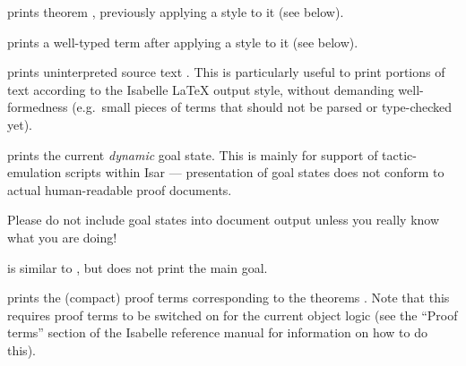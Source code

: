 \begin{isabellebody}
\begin{isamarkuptext}
\begin{descr}
  \item [\isa{{\isachardoublequote}{\isacharat}{\isacharbraceleft}thm{\isacharunderscore}style\ s\ a{\isacharbraceright}{\isachardoublequote}}] prints theorem ,
  previously applying a style  to it (see below).
  
  \item [\isa{{\isachardoublequote}{\isacharat}{\isacharbraceleft}term{\isacharunderscore}style\ s\ t{\isacharbraceright}{\isachardoublequote}}] prints a well-typed term  after applying a style  to it (see below).

  \item [\isa{{\isachardoublequote}{\isacharat}{\isacharbraceleft}text\ s{\isacharbraceright}{\isachardoublequote}}] prints uninterpreted source text .  This is particularly useful to print portions of text according
  to the Isabelle {\LaTeX} output style, without demanding
  well-formedness (e.g.\ small pieces of terms that should not be
  parsed or type-checked yet).

  \item [\isa{{\isachardoublequote}{\isacharat}{\isacharbraceleft}goals{\isacharbraceright}{\isachardoublequote}}] prints the current \emph{dynamic} goal
  state.  This is mainly for support of tactic-emulation scripts
  within Isar --- presentation of goal states does not conform to
  actual human-readable proof documents.

  Please do not include goal states into document output unless you
  really know what you are doing!
  
  \item [\isa{{\isachardoublequote}{\isacharat}{\isacharbraceleft}subgoals{\isacharbraceright}{\isachardoublequote}}] is similar to , but
  does not print the main goal.
  
  \item [\isa{{\isachardoublequote}{\isacharat}{\isacharbraceleft}prf\ a\isactrlsub {\isadigit{1}}\ {\isasymdots}\ a\isactrlsub n{\isacharbraceright}{\isachardoublequote}}] prints the (compact)
  proof terms corresponding to the theorems . Note that this requires proof terms to be switched on
  for the current object logic (see the ``Proof terms'' section of the
  Isabelle reference manual for information on how to do this).
  

\end{descr}
\end{isamarkuptext}
\end{isabellebody}
